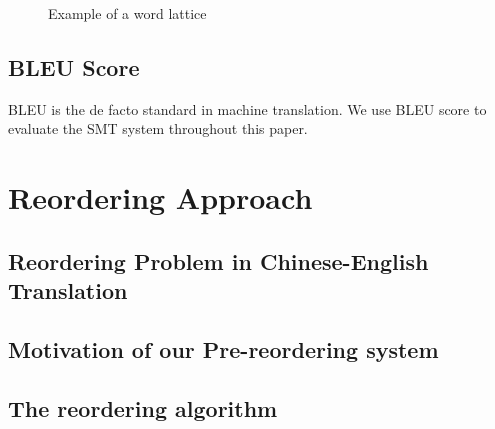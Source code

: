 \begin{landscape}
\begin{figure}
\centering

\caption{Example of a word lattice}
\end{figure}
\end{landscape}

\section{BLEU Score}
\label{ch:Foundations:sec:bleu}
BLEU is the de facto standard in machine translation\cite{metrics}. We use BLEU score to evaluate the SMT system throughout this paper.


\chapter{Reordering Approach}
\label{ch:ReorderingApproach}

\section{Reordering Problem in Chinese-English Translation}
\label{ch:ReorderingApproach:sec:Problem}

\section{Motivation of our Pre-reordering system}
\label{ch:ReorderingApproach:sec:Motivation}

\section{The reordering algorithm}
\label{ch:ReorderingApproach:sec:Algorithm}
